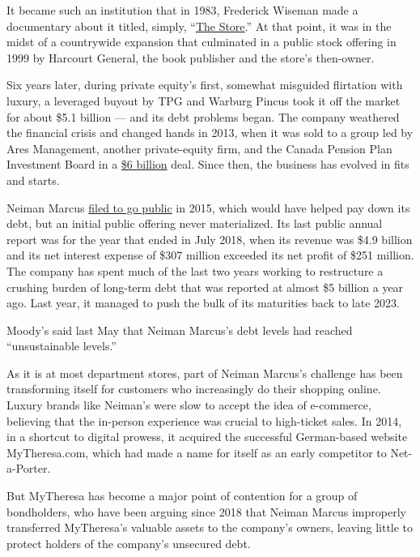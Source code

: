 It became such an institution that in 1983, Frederick Wiseman made a
documentary about it titled, simply,
``\href{https://www.nytimes3xbfgragh.onion/1983/12/14/movies/tv-the-store-a-wiseman-film.html}{The
Store}.'' At that point, it was in the midst of a countrywide expansion
that culminated in a public stock offering in 1999 by Harcourt General,
the book publisher and the store's then-owner.

Six years later, during private equity's first, somewhat misguided
flirtation with luxury, a leveraged buyout by TPG and Warburg Pincus
took it off the market for about \$5.1 billion --- and its debt problems
began. The company weathered the financial crisis and changed hands in
2013, when it was sold to a group led by Ares Management, another
private-equity firm, and the Canada Pension Plan Investment Board in a
\href{https://dealbook.nytimes3xbfgragh.onion/2013/09/09/neiman-marcus-is-sold-for-6-billion/}{\$6
billion} deal. Since then, the business has evolved in fits and starts.

Neiman Marcus
\href{https://www.nytimes3xbfgragh.onion/2015/08/05/business/dealbook/neiman-marcus-files-to-go-public-again.html}{filed
to go public} in 2015, which would have helped pay down its debt, but an
initial public offering never materialized. Its last public annual
report was for the year that ended in July 2018, when its revenue was
\$4.9 billion and its net interest expense of \$307 million exceeded its
net profit of \$251 million. The company has spent much of the last two
years working to restructure a crushing burden of long-term debt that
was reported at almost \$5 billion a year ago. Last year, it managed to
push the bulk of its maturities back to late 2023.

Moody's said last May that Neiman Marcus's debt levels had reached
``unsustainable levels.''

As it is at most department stores, part of Neiman Marcus's challenge
has been transforming itself for customers who increasingly do their
shopping online. Luxury brands like Neiman's were slow to accept the
idea of e-commerce, believing that the in-person experience was crucial
to high-ticket sales. In 2014, in a shortcut to digital prowess, it
acquired the successful German-based website MyTheresa.com, which had
made a name for itself as an early competitor to Net-a-Porter.

But MyTheresa has become a major point of contention for a group of
bondholders, who have been arguing since 2018 that Neiman Marcus
improperly transferred MyTheresa's valuable assets to the company's
owners, leaving little to protect holders of the company's unsecured
debt.

